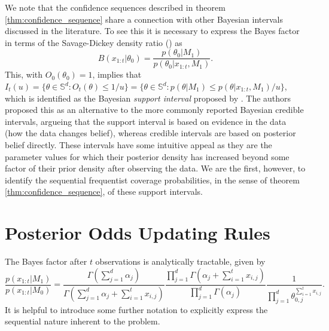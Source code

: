 \documentclass[11pt]{article}
\begin{document}
We note that the confidence sequences described in theorem \ref{thm:confidence_sequence} share a connection with other Bayesian intervals discussed in the literature. To see this it is necessary to express the Bayes factor in terms of the Savage-Dickey density ratio (\cite{dickey}) as
\begin{equation}
    B(x_{1:t}|\theta_0) = \frac{p(\theta_0| M_1)}{p(\theta_0|x_{1:t},M_1)}.
\end{equation}
This, with $O_0(\theta_0)=1$, implies that $I_t(u) = \lbrace \theta \in \mathbb{S}^d : O_t(\theta) \leq 1/u \rbrace = \lbrace \theta  \in \mathbb{S}^d : p(\theta| M_1)\leq p(\theta|x_{1:t}, M_1)/u \rbrace $, which is identified as the Bayesian \textit{support interval} proposed by \cite{support_interval}. The authors proposed this as an alternative to the more commonly reported Bayesian credible intervals, argueing that the support interval is based on evidence in the data (how the data changes belief), whereas credible intervals are based on posterior belief directly. These intervals have some intuitive appeal as they are the parameter values for which their posterior density has increased beyond some factor of their prior density after observing the data. We are the first, however, to identify the sequential frequentist coverage probabilities, in the sense of theorem \ref{thm:confidence_sequence}, of these support intervals.






\appendix
\section{Posterior Odds Updating Rules}
\label{app:posterior_odds}
The Bayes factor after $t$ observations is analytically tractable, given by
\begin{equation}
  \label{eq:bayes_factor}
 \frac{p(x_{1:t}|M_1)}{p(x_{1:t}|M_0)} = \frac{\Gamma(\sum_{j=1}^{d} \alpha_j)}{\Gamma(\sum_{j=1}^{d} \alpha_j + \sum_{i=1}^{t}x_{i,j})}\frac{\prod_{j=1}^{d}\Gamma(\alpha_j + \sum_{i=1}^{t}x_{i,j} )}{\prod_{j=1}^{d}\Gamma(\alpha_j )}\frac{1}{\prod_{j=1}^{d} \theta_{0,j}^{\sum_{i=1}^{t}x_{i,j}}}.
\end{equation}
It is helpful to introduce some further notation to explicitly express the sequential nature inherent to the problem.
\end{document}
